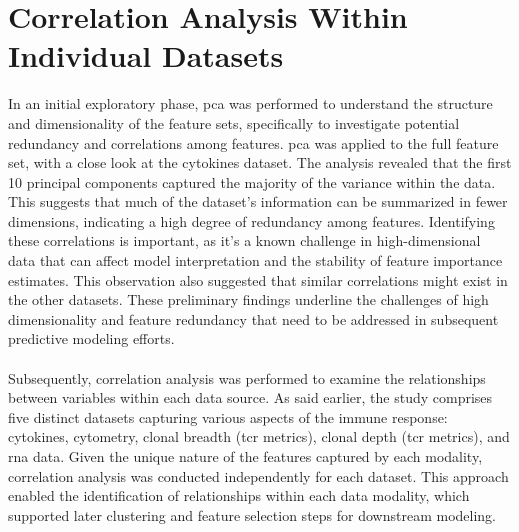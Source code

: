 \documentclass[12pt,a4paper]{report}
\begin{document}
\section{Correlation Analysis Within Individual Datasets}
\label{sec:correlation_analysis_within_individual_datasets}
\noindent
In an initial exploratory phase, \acrfull{pca} was performed to understand the structure and dimensionality of the feature sets, specifically to investigate potential redundancy and correlations among features. \gls{pca} was applied to the full feature set, with a close look at the cytokines dataset. The analysis revealed that the first 10 principal components captured the majority of the variance within the data. This suggests that much of the dataset's information can be summarized in fewer dimensions, indicating a high degree of redundancy among features. Identifying these correlations is important, as it's a known challenge in high-dimensional data that can affect model interpretation and the stability of feature importance estimates. This observation also suggested that similar correlations might exist in the other datasets. These preliminary findings underline the challenges of high dimensionality and feature redundancy  that need to be addressed in subsequent predictive modeling efforts.\\
\\
Subsequently, correlation analysis was performed to examine the relationships between variables within each data source. As said earlier, the study comprises five distinct datasets capturing various aspects of the immune response: cytokines, cytometry, clonal breadth (\gls{tcr} metrics), clonal depth (\gls{tcr} metrics), and \acrshort{rna} data. Given the unique nature of the features captured by each modality, correlation analysis was conducted independently for each dataset. This approach enabled the identification of relationships within each data modality, which supported later clustering and feature selection steps for downstream modeling.
\end{document}
